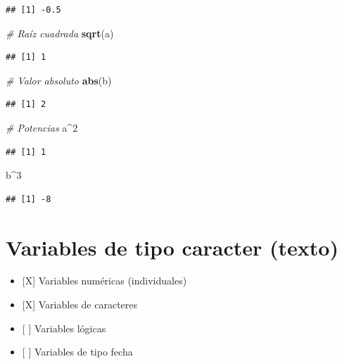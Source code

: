 \documentclass[11pt,]{book}
\newenvironment{Shaded}{\begin{snugshade}}{\end{snugshade}}
\newcommand{\CommentTok}[1]{\textcolor[rgb]{0.37,0.37,0.37}{\textit{#1}}}
\newcommand{\DecValTok}[1]{\textcolor[rgb]{0.06,0.06,0.06}{#1}}
\newcommand{\KeywordTok}[1]{\textcolor[rgb]{0.27,0.27,0.27}{\textbf{#1}}}
\newcommand{\NormalTok}[1]{#1}
\newcommand{\OperatorTok}[1]{\textcolor[rgb]{0.43,0.43,0.43}{\textbf{#1}}}
\providecommand{\tightlist}{%
  \setlength{\itemsep}{0pt}\setlength{\parskip}{0pt}}
\begin{document}
\begin{verbatim}
## [1] -0.5
\end{verbatim}

\begin{Shaded}
\begin{Highlighting}[]
\CommentTok{# Raíz cuadrada}
\KeywordTok{sqrt}\NormalTok{(a)}
\end{Highlighting}
\end{Shaded}

\begin{verbatim}
## [1] 1
\end{verbatim}

\begin{Shaded}
\begin{Highlighting}[]
\CommentTok{# Valor absoluto}
\KeywordTok{abs}\NormalTok{(b)}
\end{Highlighting}
\end{Shaded}

\begin{verbatim}
## [1] 2
\end{verbatim}

\begin{Shaded}
\begin{Highlighting}[]
\CommentTok{# Potencias}
\NormalTok{a}\OperatorTok{^}\DecValTok{2}
\end{Highlighting}
\end{Shaded}

\begin{verbatim}
## [1] 1
\end{verbatim}

\begin{Shaded}
\begin{Highlighting}[]
\NormalTok{b}\OperatorTok{^}\DecValTok{3}
\end{Highlighting}
\end{Shaded}

\begin{verbatim}
## [1] -8
\end{verbatim}

\hypertarget{caracter}{%
\section{Variables de tipo caracter (texto)}\label{caracter}}

\begin{itemize}
\tightlist
\item
  {[}X{]} Variables numéricas (individuales)
\item
  {[}X{]} Variables de caracteres
\item
  {[} {]} Variables lógicas
\item
  {[} {]} Variables de tipo fecha
\end{itemize}
\end{document}

